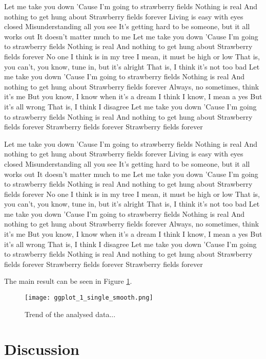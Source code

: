 \documentclass[12pt]{article}
\begin{document}
Let me take you down
'Cause I'm going to strawberry fields
Nothing is real
And nothing to get hung about
Strawberry fields forever
Living is easy with eyes closed
Misunderstanding all you see
It's getting hard to be someone, but it all works out
It doesn't matter much to me
Let me take you down
'Cause I'm going to strawberry fields
Nothing is real
And nothing to get hung about
Strawberry fields forever
No one I think is in my tree
I mean, it must be high or low
That is, you can't, you know, tune in, but it's alright
That is, I think it's not too bad
Let me take you down
'Cause I'm going to strawberry fields
Nothing is real
And nothing to get hung about
Strawberry fields forever
Always, no sometimes, think it's me
But you know, I know when it's a dream
I think I know, I mean a yes
But it's all wrong
That is, I think I disagree
Let me take you down
'Cause I'm going to strawberry fields
Nothing is real
And nothing to get hung about
Strawberry fields forever
Strawberry fields forever
Strawberry fields forever

Let me take you down
'Cause I'm going to strawberry fields
Nothing is real
And nothing to get hung about
Strawberry fields forever
Living is easy with eyes closed
Misunderstanding all you see
It's getting hard to be someone, but it all works out
It doesn't matter much to me
Let me take you down
'Cause I'm going to strawberry fields
Nothing is real
And nothing to get hung about
Strawberry fields forever
No one I think is in my tree
I mean, it must be high or low
That is, you can't, you know, tune in, but it's alright
That is, I think it's not too bad
Let me take you down
'Cause I'm going to strawberry fields
Nothing is real
And nothing to get hung about
Strawberry fields forever
Always, no sometimes, think it's me
But you know, I know when it's a dream
I think I know, I mean a yes
But it's all wrong
That is, I think I disagree
Let me take you down
'Cause I'm going to strawberry fields
Nothing is real
And nothing to get hung about
Strawberry fields forever
Strawberry fields forever
Strawberry fields forever

The main result can be seen in Figure \ref{output}.

\begin{figure}
    \centering
    \texttt{[image: ggplot\_1\_single\_smooth.png]}
    \caption{Trend of the analysed data...}
    \label{output}
\end{figure}

\section{Discussion}
\end{document}
